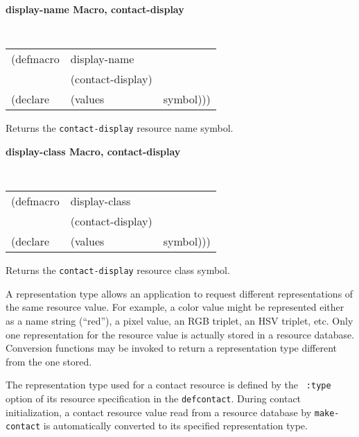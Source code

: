 \documentclass[twoside]{book}
\begin{document}
\begin{sloppy}
{\samepage
{\large {\bf display-name \hfill Macro, contact-display}} 
\begin{flushright} \parbox[t]{6.125in}{
\tt
\begin{tabular}{lll}
\raggedright
(defmacro & display-name & \\ 
& (contact-display) \\
(declare &(values  & symbol)))
\end{tabular}
\rm

}\end{flushright}}
\begin{flushright} \parbox[t]{6.125in}{
Returns the {\tt contact-display} resource name symbol.

}\end{flushright}

{\samepage
{\large {\bf display-class \hfill Macro, contact-display}} 
\begin{flushright} \parbox[t]{6.125in}{
\tt
\begin{tabular}{lll}
\raggedright
(defmacro & display-class & \\ 
& (contact-display) \\
(declare &(values  & symbol)))
\end{tabular}
\rm

}\end{flushright}}
\begin{flushright} \parbox[t]{6.125in}{
Returns the {\tt contact-display} resource class symbol.

}\end{flushright}


A representation type  allows an application to 
request different representations of the same resource value. For example, a
color value might be represented either as a name string (``red''), a pixel
value, an RGB
triplet, an HSV triplet, etc. Only one representation for the resource value is
actually stored in a resource database. Conversion functions may be invoked
to return a representation type different from the one stored.

The representation type used for a contact resource is defined by the {\tt
:type} option of its resource specification in the {\tt defcontact}. During
contact initialization, a contact resource value read from a resource
database by {\tt make-contact}
is automatically converted
to its specified representation type.


\end{sloppy}
\end{document}
